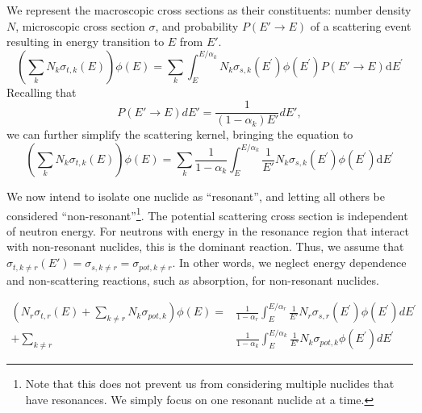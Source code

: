 \documentclass[10pt]{article}
\begin{document}
We represent the macroscopic cross sections as their constituents: number density $N$, microscopic cross section $\sigma$, and probability $P(E'\rightarrow E)$ of a scattering event resulting in energy transition to $E$ from $E'$.
\begin{equation}\left(\sum\limits_{k}N_{k}\sigma_{t,k}(E)\right)\phi(E)=\sum\limits_{k}\int_{E}^{E/\alpha_{k}}N_{k}\sigma_{s,k}\left(E^{\prime}\right)\phi\left(E^{\prime}\right)P(E'\rightarrow E)\mathrm{d}E^{\prime}\end{equation}
Recalling that 
\begin{equation}P(E'\rightarrow E)dE'=\frac{1}{(1-\alpha_k)E'}dE',\end{equation}
we can further simplify the scattering kernel, bringing the equation to
\begin{equation}\left(\sum\limits_{k}N_{k}\sigma_{t,k}(E)\right)\phi(E)=\sum\limits_{k}\frac{1}{1-\alpha_{k}}\int_{E}^{E/\alpha_{k}}\frac{1}{E'}N_{k}\sigma_{s,k}\left(E^{\prime}\right)\phi\left(E^{\prime}\right)\mathrm{d}E^{\prime}\end{equation}

We now intend to isolate one nuclide as ``resonant'', and letting all others be considered ``non-resonant''\footnote{Note that this does not prevent us from considering multiple nuclides that have resonances. We simply focus on one resonant nuclide at a time.}. The potential scattering cross section is independent of neutron energy. For neutrons with energy in the resonance region that interact with non-resonant nuclides, this is the dominant reaction. Thus, we assume that $\sigma_{t,k\neq r}(E')=\sigma_{s,k\neq r}=\sigma_{pot,k\neq r}$. In other words, we neglect energy dependence and non-scattering reactions, such as absorption, for non-resonant nuclides. 


\begin{align} \left(N_{r}\sigma_{t,r}(E)+\sum\limits_{k\neq r}N_{k}\sigma_{pot,k}\right)\phi(E)=&\frac{1}{1-\alpha_{r}}\int_{E}^{E/\alpha_{r}}\frac{1}{E'}N_{r}\sigma_{s,r}\left(E^{\prime}\right)\phi\left(E^{\prime}\right)dE^{\prime}\\ + \sum\limits_{k\neq r}&\frac{1}{1-\alpha_{k}}\int_{E}^{E/\alpha_{k}}\frac{1}{E'}N_{k}\sigma_{pot,k}\phi\left(E^{\prime}\right)dE^{\prime}\end{align}
  
  
  
\end{document}
